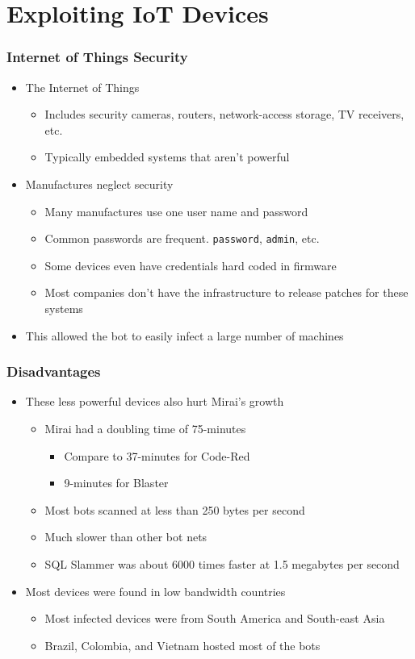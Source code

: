 \documentclass{beamer}
\begin{document}
\section{Exploiting IoT Devices}

\begin{frame}[fragile]
	\frametitle{Internet of Things Security}
	\begin{itemize}
		\item<+-> The Internet of Things
		\begin{itemize}
			\item<+-> Includes security cameras, routers, network-access storage, TV receivers, etc.
			\item<+-> Typically embedded systems that aren't powerful
		\end{itemize}
		\item<+-> Manufactures neglect security
		\begin{itemize}
			\item<+-> Many manufactures use one user name and password
			\item<+-> Common passwords are frequent. \verb|password|, \verb|admin|, etc.
			\item<+-> Some devices even have credentials hard coded in firmware
			\item<+-> Most companies don't have the infrastructure to release patches for these systems
		\end{itemize}
		\item<+-> This allowed the bot to easily infect a large number of machines
	\end{itemize}
\end{frame}

\begin{frame}
	\frametitle{Disadvantages}
	\begin{itemize}
		\item<+-> These less powerful devices also hurt Mirai's growth
		\begin{itemize}
			\item<+-> Mirai had a doubling time of 75-minutes
			\begin{itemize}
				\item<+-> Compare to 37-minutes for Code-Red
				\item<+-> 9-minutes for Blaster
			\end{itemize}
			\item<+-> Most bots scanned at less than 250 bytes per second
			\item<+-> Much slower than other bot nets
			\item<+-> SQL Slammer was about 6000 times faster at 1.5 megabytes per second
		\end{itemize}
		\item<+-> Most devices were found in low bandwidth countries
		\begin{itemize}
			\item<+-> Most infected devices were from South America and South-east Asia
			\item<+-> Brazil, Colombia, and Vietnam hosted most of the bots
		\end{itemize}
	\end{itemize}
\end{frame}
\end{document}
